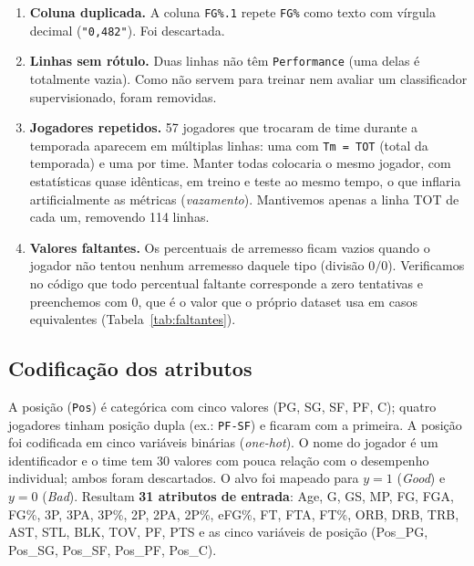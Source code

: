 \documentclass[11pt,a4paper]{article}
\begin{document}
\begin{enumerate}
  \item \textbf{Coluna duplicada.} A coluna \texttt{FG\%.1} repete \texttt{FG\%} como texto com vírgula
        decimal (\texttt{"0,482"}). Foi descartada.
  \item \textbf{Linhas sem rótulo.} Duas linhas não têm \texttt{Performance} (uma delas é totalmente vazia).
        Como não servem para treinar nem avaliar um classificador supervisionado, foram removidas.
  \item \textbf{Jogadores repetidos.} 57 jogadores que trocaram de time durante a temporada aparecem em
        múltiplas linhas: uma com \texttt{Tm = TOT} (total da temporada) e uma por time. Manter todas
        colocaria o mesmo jogador, com estatísticas quase idênticas, em treino e teste ao mesmo tempo,
        o que inflaria artificialmente as métricas (\emph{vazamento}). Mantivemos apenas a linha TOT de cada
        um, removendo 114 linhas.
  \item \textbf{Valores faltantes.} Os percentuais de arremesso ficam vazios quando o jogador não tentou
        nenhum arremesso daquele tipo (divisão $0/0$). Verificamos no código que todo percentual faltante
        corresponde a zero tentativas e preenchemos com 0, que é o valor que o próprio dataset usa em
        casos equivalentes (Tabela~\ref{tab:faltantes}).
\end{enumerate}

\begin{table}[H]\centering\small

\caption{Efeito de cada etapa da limpeza e divisão treino/teste.}\label{tab:prep}
\end{table}

\begin{table}[H]\centering\small

\caption{Valores faltantes após a remoção das linhas sem rótulo e das linhas por time.}\label{tab:faltantes}
\end{table}

\subsection{Codificação dos atributos}
A posição (\texttt{Pos}) é categórica com cinco valores (PG, SG, SF, PF, C); quatro jogadores tinham
posição dupla (ex.: \texttt{PF-SF}) e ficaram com a primeira. A posição foi codificada em cinco variáveis
binárias (\emph{one-hot}). O nome do jogador é um identificador e o time tem 30 valores com pouca
relação com o desempenho individual; ambos foram descartados. O alvo foi mapeado para
$y = 1$ (\emph{Good}) e $y = 0$ (\emph{Bad}). Resultam \textbf{31 atributos de entrada}: Age, G, GS, MP, FG, FGA, FG\%, 3P, 3PA, 3P\%, 2P, 2PA, 2P\%,
eFG\%, FT, FTA, FT\%, ORB, DRB, TRB, AST, STL, BLK, TOV, PF, PTS e as cinco variáveis de posição
(Pos\_PG, Pos\_SG, Pos\_SF, Pos\_PF, Pos\_C).
\end{document}
